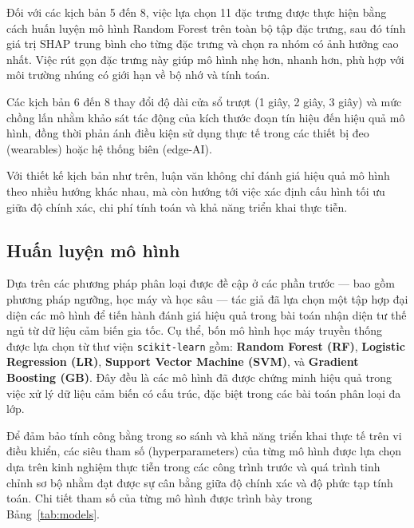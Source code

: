 Đối với các kịch bản 5 đến 8, việc lựa chọn 11 đặc trưng được thực hiện bằng cách huấn luyện mô hình Random Forest trên toàn bộ tập đặc trưng, sau đó tính giá trị SHAP trung bình cho từng đặc trưng và chọn ra nhóm có ảnh hưởng cao nhất. Việc rút gọn đặc trưng này giúp mô hình nhẹ hơn, nhanh hơn, phù hợp với môi trường nhúng có giới hạn về bộ nhớ và tính toán.

Các kịch bản 6 đến 8 thay đổi độ dài cửa sổ trượt (1 giây, 2 giây, 3 giây) và mức chồng lấn nhằm khảo sát tác động của kích thước đoạn tín hiệu đến hiệu quả mô hình, đồng thời phản ánh điều kiện sử dụng thực tế trong các thiết bị đeo (wearables) hoặc hệ thống biên (edge-AI).

Với thiết kế kịch bản như trên, luận văn không chỉ đánh giá hiệu quả mô hình theo nhiều hướng khác nhau, mà còn hướng tới việc xác định cấu hình tối ưu giữa độ chính xác, chi phí tính toán và khả năng triển khai thực tiễn.

\subsection{Huấn luyện mô hình}

Dựa trên các phương pháp phân loại được đề cập ở các phần trước — 
bao gồm phương pháp ngưỡng, học máy và học sâu — 
tác giả đã lựa chọn một tập hợp đại diện các mô hình để 
tiến hành đánh giá hiệu quả trong bài toán nhận diện tư thế ngủ 
từ dữ liệu cảm biến gia tốc. Cụ thể, bốn mô hình học máy truyền 
thống được lựa chọn từ thư viện \texttt{scikit-learn} gồm: 
\textbf{Random Forest (RF)}, \textbf{Logistic Regression (LR)}, 
\textbf{Support Vector Machine (SVM)}, và \textbf{Gradient Boosting (GB)}. 
Đây đều là các mô hình đã được chứng minh hiệu quả trong việc xử lý dữ 
liệu cảm biến có cấu trúc, đặc biệt trong các bài toán phân loại đa lớp.

Để đảm bảo tính công bằng trong so sánh và khả năng triển khai thực tế trên vi điều khiển, các siêu tham số (hyperparameters) của từng mô hình được lựa chọn dựa trên kinh nghiệm thực tiễn trong các công trình trước và quá trình tinh chỉnh sơ bộ nhằm đạt được sự cân bằng giữa độ chính xác và độ phức tạp tính toán. Chi tiết tham số của từng mô hình được trình bày trong Bảng~\ref{tab:models}.

